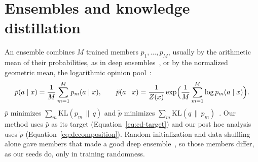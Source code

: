 \section{Ensembles and knowledge distillation}
\label{sec:bg-distill}

An ensemble combines $M$ trained members $p_1,\dots,p_M$, usually by the
arithmetic mean of their probabilities, as in deep
ensembles~\cite{lakshminarayanan2016simple}, or by the normalized
geometric mean, the logarithmic opinion pool~\cite{heskes1997selecting}:
\begin{equation}
  \bar{p}(a\mid x)=\frac{1}{M}\sum_{m=1}^{M}p_m(a\mid x),
  \qquad
  \tilde{p}(a\mid x)=\frac{1}{Z(x)}
  \exp\Bigl(\frac{1}{M}\sum_{m=1}^{M}\log p_m(a\mid x)\Bigr) .
  \label{eq:bg-pools}
\end{equation}
$\bar{p}$ minimizes $\sum_m\mathrm{KL}(p_m\,\|\,q)$ and $\tilde{p}$
minimizes $\sum_m\mathrm{KL}(q\,\|\,p_m)$~\cite{hinton2015distilling}.
Our method uses $\bar{p}$ as its target (Equation~\ref{eq:cd-target})
and our post hoc analysis uses $\tilde{p}$
(Equation~\ref{eq:decomposition}). Random initialization and data
shuffling alone gave members that made a good deep
ensemble~\cite{lakshminarayanan2016simple}, so those members differ,
as our seeds do, only in training randomness.

